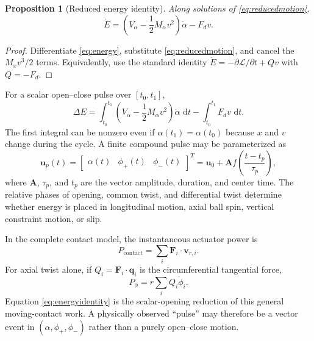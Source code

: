 \documentclass[11pt]{article}
\numberwithin{equation}{section}
\newtheorem{proposition}{Proposition}[section]
\theoremstyle{definition}
\theoremstyle{remark}
\newcommand{\dd}{\,\mathrm{d}}
\begin{document}
\begin{proposition}[Reduced energy identity]
Along solutions of \cref{eq:reducedmotion},
\begin{equation}
  \dot E
  =\left(V_\alpha-\frac12M_\alpha v^2\right)\dot\alpha
   -F_dv.
  \label{eq:energyidentity}
\end{equation}
\end{proposition}

\begin{proof}
Differentiate \cref{eq:energy}, substitute \cref{eq:reducedmotion}, and cancel the $M_xv^3/2$ terms.  Equivalently, use the standard identity $\dot E=-\partial\mathcal L/\partial t+Qv$ with $Q=-F_d$.
\end{proof}

For a scalar open--close pulse over $[t_0,t_1]$,
\begin{equation}
  \Delta E
  =\int_{t_0}^{t_1}
  \left(V_\alpha-\frac12M_\alpha v^2\right)\dot\alpha\,\dd t
  -\int_{t_0}^{t_1}F_dv\,\dd t.
  \label{eq:pulseenergy}
\end{equation}
The first integral can be nonzero even if $\alpha(t_1)=\alpha(t_0)$ because $x$ and $v$ change during the cycle.  A finite compound pulse may be parameterized as
\begin{equation}
  \bm u_p(t)
  =\begin{bmatrix}\alpha(t)&\phi_+(t)&\phi_-(t)\end{bmatrix}^{T}
  =\bm u_0+\bm A f\!\left(\frac{t-t_p}{\tau_p}\right),
  \label{eq:pulseform}
\end{equation}
where $\bm A$, $\tau_p$, and $t_p$ are the vector amplitude, duration, and center time.  The relative phases of opening, common twist, and differential twist determine whether energy is placed in longitudinal motion, axial ball spin, vertical constraint motion, or slip.

In the complete contact model, the instantaneous actuator power is
\begin{equation}
  P_{\mathrm{contact}}
  =\sum_i\bm F_i\cdot\bm v_{r,i}.
  \label{eq:contactpower}
\end{equation}
For axial twist alone, if $Q_i=\bm F_i\cdot\bm q_i$ is the circumferential tangential force,
\begin{equation}
  P_{\phi}=r\sum_i Q_i\dot\phi_i.
  \label{eq:twistpower}
\end{equation}
Equation \cref{eq:energyidentity} is the scalar-opening reduction of this general moving-contact work.  A physically observed ``pulse'' may therefore be a vector event in $(\alpha,\phi_+,\phi_-)$ rather than a purely open--close motion.
\end{document}

